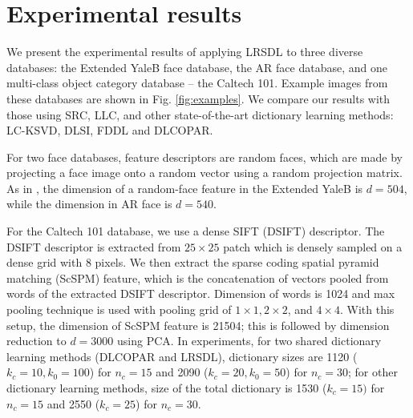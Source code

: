 \documentclass[letterpaper]{article}
\begin{document}
\section{Experimental results} %
\vspace{-0.1in}
\label{sec:experiment_results}

We present the experimental results of applying LRSDL to three diverse databases: the Extended YaleB face database\cite{georghiades2001few}, the AR face database\cite{ardataset}, and one multi-class object category database -- the Caltech 101\cite{fei2007learning}. Example images from these databases are shown in Fig. \ref{fig:examples}.
We compare our results with those using SRC\cite{qi2012robust}, LLC\cite{song2015locality}, and other state-of-the-art dictionary learning methods: LC-KSVD\cite{Zhuolin2013LCKSVD}, DLSI\cite{ramirez2010classification}, FDDL\cite{Meng2011FDDL} and DLCOPAR\cite{kong2012dictionary}.
\par
For two face databases, feature descriptors are random faces, which are made by projecting a face image onto a random vector using a random projection matrix. As in \cite{zhang2010discriminative}, the dimension of a random-face feature in  the Extended YaleB is $d= 504$, while the dimension in AR face is $d = 540$.
\par For the Caltech 101 database, we use a dense SIFT (DSIFT) descriptor. The DSIFT descriptor is extracted from $25\times 25$ patch which is densely sampled on a dense grid with 8 pixels. We then extract the sparse coding spatial pyramid matching (ScSPM) feature\cite{yang2009linear}, which is the concatenation of vectors pooled from words of the extracted DSIFT descriptor. Dimension of words is 1024 and max pooling technique is used with pooling grid of $1\times 1, 2 \times 2$, and $4 \times 4$. With this setup, the dimension of ScSPM feature is 21504; this is followed by dimension reduction to $d = 3000$ using PCA. In experiments, for two shared dictionary learning methods (DLCOPAR\cite{kong2012dictionary} and LRSDL), dictionary sizes are 1120 ($k_c=10,k_0 = 100$) for $n_c = 15$ and 2090 ($k_c = 20, k_0 = 50$) for $n_c = 30$; for other dictionary learning methods, size of the total dictionary is 1530 ($k_c = 15)$ for $n_c = 15$ and 2550 ($k_c = 25$) for $n_c = 30$.
\end{document}

